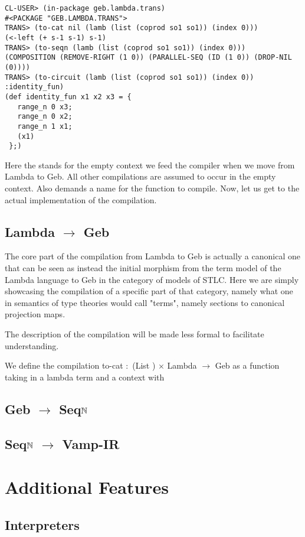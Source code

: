 \begin{verbatim}
CL-USER> (in-package geb.lambda.trans)
#<PACKAGE "GEB.LAMBDA.TRANS">
TRANS> (to-cat nil (lamb (list (coprod so1 so1)) (index 0)))
(<-left (+ s-1 s-1) s-1)
TRANS> (to-seqn (lamb (list (coprod so1 so1)) (index 0)))
(COMPOSITION (REMOVE-RIGHT (1 0)) (PARALLEL-SEQ (ID (1 0)) (DROP-NIL (0))))
TRANS> (to-circuit (lamb (list (coprod so1 so1)) (index 0)) :identity_fun)
(def identity_fun x1 x2 x3 = {
   range_n 0 x3;
   range_n 0 x2;
   range_n 1 x1;
   (x1)
 };)

\end{verbatim}

Here the  stands for the empty context we feed the compiler when we move from Lambda to Geb. All other compilations are assumed to occur in the empty context. Also  demands a name for the function to compile. Now, let us get to the actual implementation of the compilation.

\subsection{Lambda $\to$ Geb}
The core part of the compilation from Lambda to Geb is actually a canonical one that can be seen as instead the initial morphism from the term model of the Lambda language to Geb in the category of models of STLC. Here we are simply showcasing the compilation of a specific part of that category, namely what one in semantics of type theories would call "terms", namely sections to canonical projection maps.

The description of the compilation will be made less formal to facilitate understanding.

 We define the compilation to-cat $\colon$ (List \gebobj) $\times$ Lambda $\to$ Geb as a function taking in a lambda term and a context with 

\subsection{Geb $\to$ Seq$\mathbb{N}$}
\subsection{Seq$\mathbb{N}$ $\to$ Vamp-IR}

\section{Additional Features}
\subsection{Interpreters}
